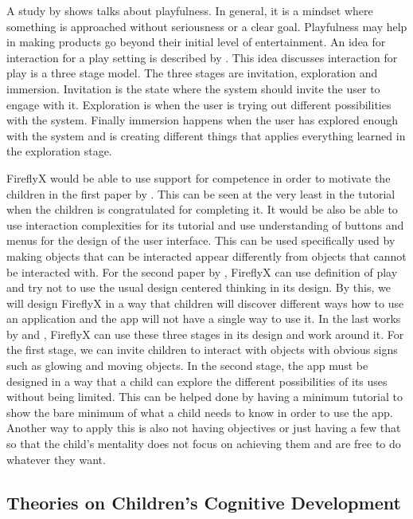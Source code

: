 A study by  shows talks about playfulness. In general, it is a mindset where something is approached without seriousness or a clear goal. Playfulness may help in making products go beyond their initial level of entertainment. An idea for interaction for a play setting is described by . This idea discusses interaction for play is a three stage model. The three stages are invitation, exploration and immersion. Invitation is the state where the system should invite the user to engage with it. Exploration is when the user is trying out different possibilities with the system. Finally immersion happens when the user has explored enough with the system and is creating different things that applies everything learned in the exploration stage.

FireflyX would be able to use support for competence in order to motivate the children in the first paper by . This can be seen at the very least in the tutorial when the children is congratulated for completing it. It would be also be able to use interaction complexities for its tutorial and use understanding of buttons and menus for the design of the user interface. This can be used specifically used by making objects that can be interacted appear differently from objects that cannot be interacted with. For the second paper by , FireflyX can use definition of play and try not to use the usual design centered thinking in its design. By this, we will design FireflyX in a way that children will discover different ways how to use an application and the app will not have a single way to use it. In the last works by  and , FireflyX can use these three stages in its design and work around it. For the first stage, we can invite children to interact with objects with obvious signs such as glowing and moving objects. In the second stage, the app must be designed in a way that a child can explore the different possibilities of its uses without being limited. This can be helped done by having a minimum tutorial to show the bare minimum of what a child needs to know in order to use the app. Another way to apply this is also not having objectives or just having a few that so that the child's mentality does not focus on achieving them and are free to do whatever they want. 

\subsection{Theories on Children's Cognitive Development}

